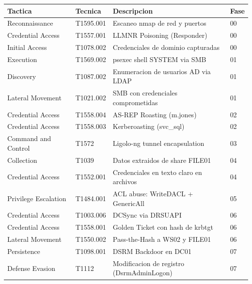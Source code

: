 \documentclass[11pt,a4paper]{article}
\begin{document}
\begin{center}
\begin{tabularx}{\textwidth}{llXl}
\toprule
\textbf{Tactica} & \textbf{Tecnica} & \textbf{Descripcion} & \textbf{Fase} \\
\midrule
Reconnaissance         & T1595.001 & Escaneo nmap de red y puertos              & 00 \\
Credential Access      & T1557.001 & LLMNR Poisoning (Responder)               & 00 \\
Initial Access         & T1078.002 & Credenciales de dominio capturadas        & 00 \\
Execution              & T1569.002 & psexec shell SYSTEM via SMB               & 01 \\
Discovery              & T1087.002 & Enumeracion de usuarios AD via LDAP       & 01 \\
Lateral Movement       & T1021.002 & SMB con credenciales comprometidas        & 01 \\
Credential Access      & T1558.004 & AS-REP Roasting (m.jones)                 & 02 \\
Credential Access      & T1558.003 & Kerberoasting (svc\_sql)                  & 02 \\
Command and Control    & T1572     & Ligolo-ng tunnel encapsulation            & 03 \\
Collection             & T1039     & Datos extraidos de share FILE01           & 04 \\
Credential Access      & T1552.001 & Credenciales en texto claro en archivos   & 04 \\
Privilege Escalation   & T1484.001 & ACL abuse: WriteDACL + GenericAll         & 05 \\
Credential Access      & T1003.006 & DCSync via DRSUAPI                        & 06 \\
Credential Access      & T1558.001 & Golden Ticket con hash de krbtgt          & 06 \\
Lateral Movement       & T1550.002 & Pass-the-Hash a WS02 y FILE01             & 06 \\
Persistence            & T1098.001 & DSRM Backdoor en DC01                     & 07 \\
Defense Evasion        & T1112     & Modificacion de registro (DsrmAdminLogon) & 07 \\
\bottomrule
\end{tabularx}
\end{center}

\newpage
\end{document}
